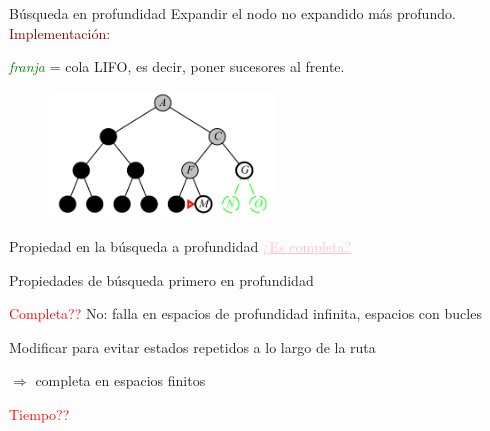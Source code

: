 \documentclass{beamer}
\theoremstyle{definition}
\theoremstyle{theorem}
\theoremstyle{remark}
\begin{document}
\begin{frame}{Búsqueda en profundidad}
    Expandir el nodo no expandido más profundo.\\
    \textcolor{DarkRed}{Implementación:}
    \begin{center}
        \textit{\textcolor{Green}{franja}} = cola LIFO, es decir, poner sucesores al
        frente.\\
    \end{center}
    \begin{figure}
        \centering
        \includegraphics[width = 60mm, scale = 0.7]{54_image.PNG}
    \end{figure}
\end{frame}{}


\begin{frame}{Propiedad en la búsqueda a profundidad}
    \textcolor{pink}{\underline{¿Es completa?}}
\end{frame}


\begin{frame}{Propiedades de búsqueda primero en profundidad}
    
      
    \textcolor{red}{Completa??} No: falla en espacios de profundidad infinita, espacios con bucles
        
    \quad \quad \quad Modificar para evitar estados repetidos a lo largo de la ruta
        
    \quad \quad \quad \quad \quad $\Rightarrow$ completa en espacios finitos
    \bigskip
        
    \textcolor{red}{Tiempo??}
        
\end{frame}
\end{document}
